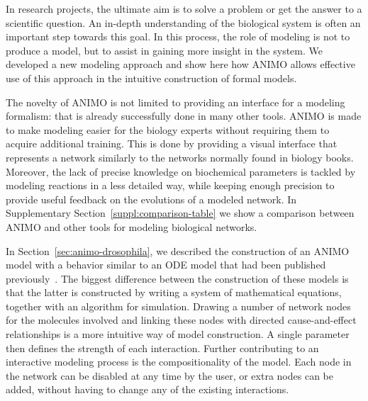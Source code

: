 In research projects, the ultimate aim is to solve a problem or get
the answer to a scientific question. An in-depth understanding of
the biological system is often an important step towards this goal.
In this process, the role of modeling is not to produce a model, but
to assist in gaining more insight in the system. We developed a new
modeling approach and show here how ANIMO allows effective use of
this approach in the intuitive construction of formal models.

The novelty of ANIMO is not limited to providing an interface
for a modeling formalism: that is already successfully done in many other tools.
ANIMO is made to make modeling easier for the biology experts
without requiring them to acquire additional training. This
is done by providing a visual interface that represents a network
similarly to the networks normally found in biology books.
Moreover, the lack of precise knowledge on biochemical parameters
is tackled by modeling reactions in a less detailed way,
while keeping enough precision to provide useful feedback on the
evolutions of a modeled network.
In Supplementary Section~\ref{suppl:comparison-table} we show a
comparison between ANIMO and other tools for modeling biological networks.

In Section~\ref{sec:animo-drosophila}, we described the construction of an ANIMO
model with a behavior similar to an ODE model that had been
published previously~\citep{drosophila-ode-model}. The biggest
difference between the construction of these models is that the latter
is constructed by writing a system of mathematical equations, together
with an algorithm for simulation. Drawing a number of network
nodes for the molecules involved and linking these nodes with directed
cause-and-effect relationships is a more intuitive way of model
construction. A single parameter then defines the strength of each
interaction. Further contributing to an interactive modeling process
is the compositionality of the model. Each node in the network
can be disabled at any time by the user, or extra nodes can be added,
without having to change any of the existing interactions.


